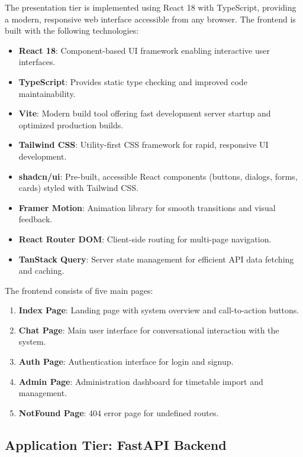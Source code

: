 The presentation tier is implemented using React 18 with TypeScript, providing a modern, responsive web interface accessible from any browser. The frontend is built with the following technologies:

\begin{itemize}
    \item \textbf{React 18}: Component-based UI framework enabling interactive user interfaces.
    \item \textbf{TypeScript}: Provides static type checking and improved code maintainability.
    \item \textbf{Vite}: Modern build tool offering fast development server startup and optimized production builds.
    \item \textbf{Tailwind CSS}: Utility-first CSS framework for rapid, responsive UI development.
    \item \textbf{shadcn/ui}: Pre-built, accessible React components (buttons, dialogs, forms, cards) styled with Tailwind CSS.
    \item \textbf{Framer Motion}: Animation library for smooth transitions and visual feedback.
    \item \textbf{React Router DOM}: Client-side routing for multi-page navigation.
    \item \textbf{TanStack Query}: Server state management for efficient API data fetching and caching.
\end{itemize}

The frontend consists of five main pages:

\begin{enumerate}
    \item \textbf{Index Page}: Landing page with system overview and call-to-action buttons.
    \item \textbf{Chat Page}: Main user interface for conversational interaction with the system.
    \item \textbf{Auth Page}: Authentication interface for login and signup.
    \item \textbf{Admin Page}: Administration dashboard for timetable import and management.
    \item \textbf{NotFound Page}: 404 error page for undefined routes.
\end{enumerate}

\subsection{Application Tier: FastAPI Backend}


